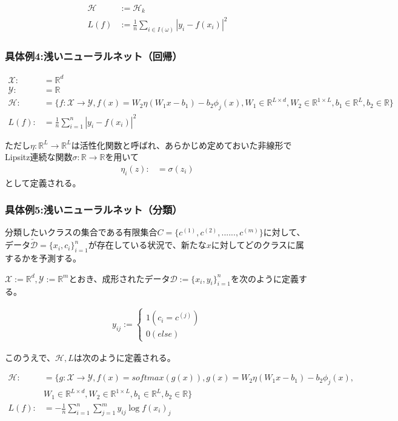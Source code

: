 \documentclass{jsarticle}
\begin{document}
\begin{align}
\mathcal{H}&:=\mathcal{H}_k\\
L(f)&:=\frac{1}{n}\sum_{i\in I(\omega)}|y_i-f(x_i)|^2
\end{align}


\subsubsection{具体例4:浅いニューラルネット（回帰）}
\begin{align}
\mathcal{X}:&=\mathbb{R}^d\\
\mathcal{Y}:&=\mathbb{R}\\
\mathcal{H}:&=\{f:\mathcal{X}\to\mathcal{Y},f(x)=W_2\eta(W_1x-b_1)-b_2\phi_j(x),W_1\in\mathbb{R}^{L\times d},W_2\in \mathbb{R}^{1\times L},b_1\in\mathbb{R}^L,b_2\in\mathbb{R}\}\\
L(f):&=\frac{1}{n}\sum^n_{i=1}|y_i-f(x_i)|^2
\end{align}

ただし$\eta:\mathbb{R}^L\to\mathbb{R}^L$は活性化関数と呼ばれ、あらかじめ定めておいた非線形でLipsitz連続な関数$\sigma:\mathbb{R}\to\mathbb{R}$を用いて
\begin{align}
\eta_i(z):&=\sigma(z_i)
\end{align}
として定義される。



\subsubsection{具体例5:浅いニューラルネット（分類）}
分類したいクラスの集合である有限集合$C=\{c^{(1)},c^{(2)},......,c^{(m)}\}$に対して、データ$\tilde{\mathcal{D}}=\{x_i,c_i\}^n_{i=1}$が存在している状況で、新たな$x$に対してどのクラスに属するかを予測する。

$\mathcal{X}:=\mathbb{R}^d,\mathcal{Y}:=\mathbb{R}^m$とおき、成形されたデータ$\mathcal{D}:=\{x_i,y_i\}^n_{i=1}$を次のように定義する。

\begin{align}
y_{ij}:=\begin{cases}
    1(c_i=c^{(j)})\\
    0(else)
\end{cases}
\end{align}

このうえで、$\mathcal{H},L$は次のように定義される。


\begin{align*}
\mathcal{H}:&=\{g:\mathcal{X}\to\mathcal{Y},f(x)=softmax(g(x)),g(x)=W_2\eta(W_1x-b_1)-b_2\phi_j(x),\\ 
&W_1\in\mathbb{R}^{L\times d},W_2\in \mathbb{R}^{1\times L},b_1\in\mathbb{R}^L,b_2\in\mathbb{R}\}\\
L(f):&=-\frac{1}{n}\sum^n_{i=1}\sum^m_{j=1}y_{ij}\log{f(x_i)_j}
\end{align*}
\end{document}
